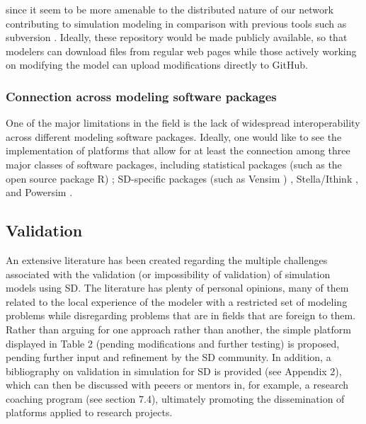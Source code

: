\documentclass[11pt]{article}
\begin{document}

\cite{GITCHACON2009} since it seem to be more amenable to the distributed nature of our network \cite{git} contributing to simulation modeling in comparison with previous tools such as subversion \cite{subversion}.  Ideally, these repository would be made publicly available, so that modelers can download files from regular web pages while those actively working on modifying the model can upload modifications directly to GitHub.

\subsubsection {Connection across modeling software packages}
One of the major limitations in the field is the lack of widespread interoperability across different modeling software packages.  Ideally, one would like to see the implementation of platforms that allow for at least the connection among three major classes of software packages, including statistical packages (such as the open source package R) \cite{r-project}; SD-specific packages (such as Vensim \cite{vensim}) , Stella/Ithink \cite{iseesystems} , and Powersim \cite{powersim}.

\subsection {Validation}
An extensive literature has been created regarding the multiple challenges associated with the validation (or impossibility of validation) of simulation models using SD.  The literature has plenty of personal opinions, many of them related to the local experience of the modeler with a restricted set of modeling problems while disregarding problems that are in fields that are foreign to them.  Rather than arguing for one approach rather than another, the simple platform displayed in Table 2 (pending modifications and further testing) is proposed, pending further input and refinement by the SD community.  In addition, a bibliography on validation in simulation for SD is provided (see Appendix 2), which can then be discussed with peeers or mentors in, for example, a research coaching program (see section 7.4), ultimately promoting the dissemination of platforms applied to research projects.
\end{document}
